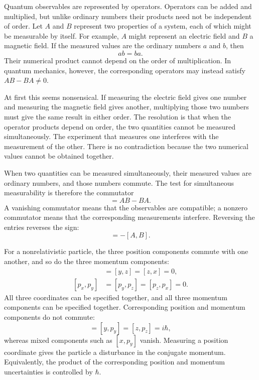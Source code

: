 Quantum observables are represented by operators. Operators can be added and multiplied, but unlike ordinary numbers their products need not be independent of order. Let \(A\) and \(B\) represent two properties of a system, each of which might be measurable by itself. For example, \(A\) might represent an electric field and \(B\) a magnetic field. If the measured values are the ordinary numbers \(a\) and \(b\), then
\begin{equation}
ab=ba.
\end{equation}
Their numerical product cannot depend on the order of multiplication. In quantum mechanics, however, the corresponding operators may instead satisfy \(AB-BA\neq0\).

At first this seems nonsensical. If measuring the electric field gives one number and measuring the magnetic field gives another, multiplying those two numbers must give the same result in either order. The resolution is that when the operator products depend on order, the two quantities cannot be measured simultaneously. The experiment that measures one interferes with the measurement of the other. There is no contradiction because the two numerical values cannot be obtained together.

When two quantities can be measured simultaneously, their measured values are ordinary numbers, and those numbers commute. The test for simultaneous measurability is therefore the commutator
\begin{equation}
[A,B]=AB-BA.
\end{equation}
A vanishing commutator means that the observables are compatible; a nonzero commutator means that the corresponding measurements interfere. Reversing the entries reverses the sign:
\begin{equation}
[B,A]=-[A,B].
\end{equation}

For a nonrelativistic particle, the three position components commute with one another, and so do the three momentum components:
\begin{align}
[x,y]&=[y,z]=[z,x]=0,\\
[p_x,p_y]&=[p_y,p_z]=[p_z,p_x]=0.
\end{align}
All three coordinates can be specified together, and all three momentum components can be specified together. Corresponding position and momentum components do not commute:
\begin{equation}
[x,p_x]=[y,p_y]=[z,p_z]=i\hbar,
\end{equation}
whereas mixed components such as \([x,p_y]\) vanish. Measuring a position coordinate gives the particle a disturbance in the conjugate momentum. Equivalently, the product of the corresponding position and momentum uncertainties is controlled by \(\hbar\).

